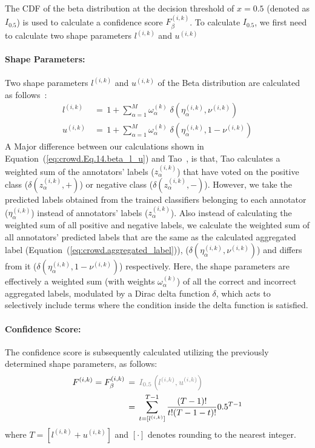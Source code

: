 \documentclass[sn-nature]{bst/sn-jnl}
\begin{document}
The CDF of the beta distribution at the decision threshold of $x=0.5 $ (denoted as $I_{0.5}$) is used to calculate a confidence score $F_{\beta}^{(i,k)}$. To calculate $I_{0.5}$, we first need to calculate two shape parameters $l^{(i,k)}$ and $u^{(i,k)}$
\paragraph{\textbf{Shape Parameters:}}
Two shape parameters $l^{(i,k)}$ and $u^{(i,k)}$ of the Beta distribution are calculated as follows~\cite{tao_Label_2020}:
\begin{equation}
    \begin{aligned}
        l^{(i,k)} \, & = \, 1 + \sum_{\alpha=1}^{M} \omega_{\alpha}^{(k)} \; \delta\left(\eta_{\alpha}^{(i,k)}, \nu^{(i,k)}\right) \\
        u^{(i,k)} \, & = \, 1 + \sum_{\alpha=1}^{M} \omega_{\alpha}^{(k)} \; \delta\left(\eta_{\alpha}^{(i,k)}, 1 - \nu^{(i,k)}\right)
    \end{aligned}
    \label{eq:crowd.Eq.14.beta_l_u}
\end{equation}
A Major difference between our calculations shown in Equation~(\ref{eq:crowd.Eq.14.beta_l_u}) and Tao~\cite{tao_Label_2020}, is that, Tao calculates a weighted sum of the annotators' labels ($z_{\alpha}^{(i,k)}$) that have voted on the positive class ($\delta (z_\alpha^{(i,k)},+)$) or negative class ($\delta (z_\alpha^{(i,k)},-)$). However, we take the predicted labels obtained from the trained classifiers belonging to each annotator ($\eta_{\alpha}^{(i,k)}$) instead of annotators' labels ($z_\alpha^{(i,k)}$). Also instead of calculating the weighted sum of all positive and negative labels, we calculate the weighted sum of all annotators' predicted labels that are the same as the calculated aggregated label (Equation~(\ref{eq:crowd.aggregated_label})), ($\delta (\eta_{\alpha}^{(i,k)}, \nu^{(i,k)})$) and differs from it ($\delta (\eta_{\alpha}^{(i,k)}, 1-\nu^{(i,k)})$) respectively.
Here, the shape parameters are effectively a weighted sum (with weights $\omega_{\alpha}^{(k)}$) of all the correct and incorrect aggregated labels, modulated by a Dirac delta function $\delta$, which acts to selectively include terms where the condition inside the delta function is satisfied.
\paragraph{\textbf{Confidence Score:}}
The confidence score is subsequently calculated utilizing the previously determined shape parameters, as follows:
\begin{align}
    F^{(i,k)} = F_{\beta}^{(i,k)}
    \, & = \, \textcolor{gray}{I_{0.5}\left(l^{(i,k)},u^{(i,k)}\right)} \\
    \, & = \, \sum_{t=[l^{(i,k)}]}^{T-1}\frac{(T-1)!}{t!(T-1-t)!}0.5^{T-1}
    \label{eq:crowd.Eq.15.confidence-score.Beta}
\end{align}
where $T = \left [ l^{(i,k)} + u^{(i,k)} \right ] $ and $\left [ \cdot \right ] $ denotes rounding to the nearest integer.
\end{document}
